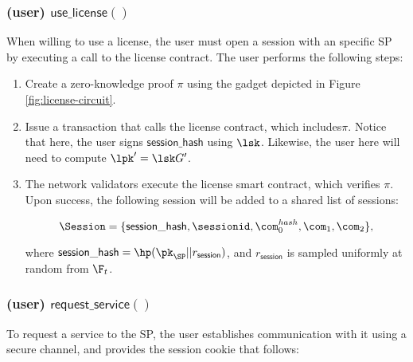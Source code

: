 \subsubsection{(\textbf{user}) $\mathsf{use\_license()}$}

When willing to use a license, the user must open a session with an specific SP by executing a call to the license contract. The user performs the following steps:


\begin{enumerate}
	\item Create a zero-knowledge proof $\pi$ using the gadget depicted in Figure \ref{fig:license-circuit}.
	
	\item Issue a transaction that calls the license contract, which includes$\pi$. Notice that here, the user signs $\mathsf{session\_hash}$ using $\lsk$. Likewise, the user here will need to compute $\lpk' = \lsk G'$.
	
	\item The network validators execute the license smart contract, which verifies $\pi$. Upon success, the following session will be added to a shared list of sessions:
	
	$$\Session = \{\mathsf{session\_hash}, \sessionid, \com_0^{hash}, \com_1, \com_2\},$$
	
	where $\mathsf{session\_hash} = \hp(\pk_{\SP} || r_\mathsf{session})$, and $r_\mathsf{session}$ is sampled uniformly at random from $\F_t$.
	
\end{enumerate}

\subsubsection{(\textbf{user}) $\mathsf{request\_service()}$}

To request a service to the SP, the user establishes communication with it using a secure channel, and provides the session cookie that follows:

